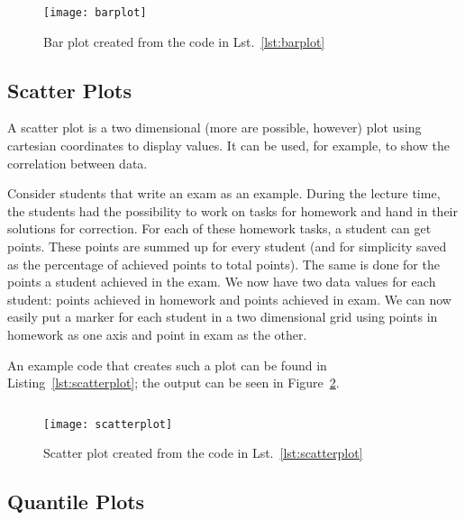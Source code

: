 \begin{listing}[H]
  \inputminted{latex}{../examples/barplot.tex}
  \caption{Code example to create the bar plot in Fig.~\ref{fig:barplot}}
  \label{lst:barplot}
\end{listing}
\begin{figure}[!t]
  \centering
  \texttt{[image: barplot]}
  \caption{Bar plot created from the code in Lst.~\ref{lst:barplot}}
  \label{fig:barplot}
\end{figure}

\subsection{Scatter Plots}

A scatter plot is a two dimensional (more are possible, however) plot using
cartesian coordinates to display values.  It can be used, for example, to show
the correlation between data.

Consider students that write an exam as an example.  During the lecture time,
the students had the possibility to work on tasks for homework and hand in their
solutions for correction.  For each of these homework tasks, a student can get
points.  These points are summed up for every student (and for simplicity saved
as the percentage of achieved points to total points).  The same is done for the
points a student achieved in the exam.  We now have two data values for each
student: points achieved in homework and points achieved in exam.  We can now
easily put a marker for each student in a two dimensional grid using points in
homework as one axis and point in exam as the other.

An example code that creates such a plot can be found in
Listing~\ref{lst:scatterplot}; the output can be seen in
Figure~\ref{fig:scatterplot}.

\begin{listing}[H]
  \inputminted{latex}{../examples/scatterplot.tex}
  \caption{Code example to create a scatter plot from a CSV}
  \label{lst:scatterplot}
\end{listing}

\begin{figure}[!t]
  \centering
  \texttt{[image: scatterplot]}
  \caption{Scatter plot created from the code in Lst.~\ref{lst:scatterplot}}
  \label{fig:scatterplot}
\end{figure}

\subsection{Quantile Plots}

